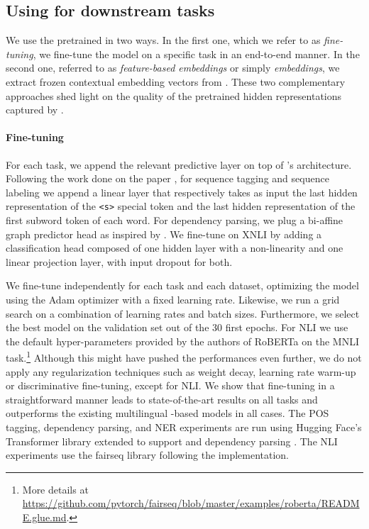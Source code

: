 \subsection{Using \camembert for downstream tasks}
We use the pretrained \camembert in two ways. In the first one, which we refer to as \textit{fine-tuning}, we fine-tune the model on a specific task in an end-to-end manner. In the second one, referred to as \textit{feature-based embeddings} or simply \textit{embeddings}, we extract frozen contextual embedding vectors from \camembert.
These two complementary approaches shed light on the quality of the pretrained hidden representations captured by \camembert.


\paragraph{Fine-tuning}
For each task, we append the relevant predictive layer on top of \camembert's  architecture. Following the work done on the \bert paper \citep{devlin-etal-2019-bert}, for sequence tagging and sequence labeling we append a linear layer that respectively takes as input the last hidden representation of the \texttt{<s>} special token and the last hidden representation of the first subword token of each word. For dependency parsing, we plug a bi-affine graph predictor head as inspired by \citet{dozat-manning-2017-deep}. We fine-tune on XNLI by adding a classification head composed of one hidden layer with a non-linearity and one linear projection layer, with input dropout for both.

We fine-tune \camembert independently for each task and each dataset, optimizing the model using the Adam optimizer \citep{kingma-ba-2015-adam} with a fixed learning rate. Likewise, we run a grid search on a combination of learning rates and batch sizes. Furthermore, we select the best model on the validation set out of the 30 first epochs. For NLI we use the default hyper-parameters provided by the authors of RoBERTa on the MNLI task.\footnote{More details at \url{https://github.com/pytorch/fairseq/blob/master/examples/roberta/README.glue.md}.} Although this might have pushed the performances even further, we do not apply any regularization techniques such as weight decay, learning rate warm-up or discriminative fine-tuning, except for NLI. We show that fine-tuning \camembert in a straightforward manner leads to state-of-the-art results on all tasks and outperforms the existing multilingual \bert-based models in all cases. The POS tagging, dependency parsing, and NER experiments are run using Hugging Face's Transformer library extended to support \camembert and dependency parsing \citep{wolf-etal-2019-huggingface}. The NLI experiments use the fairseq library following the \roberta implementation.

